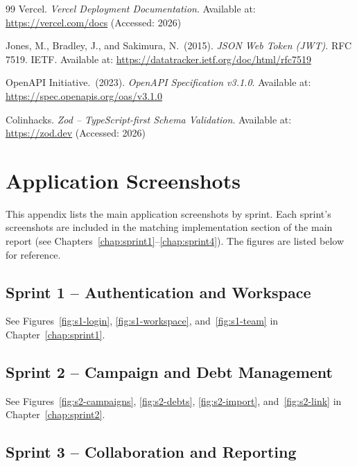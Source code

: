 \documentclass[12pt,a4paper]{report}
\begin{document}
\begin{thebibliography}{99}
    Vercel.
    \textit{Vercel Deployment Documentation}.
    Available at: \url{https://vercel.com/docs}
    (Accessed: 2026)

    Jones, M., Bradley, J., and Sakimura, N.\ (2015).
    \textit{JSON Web Token (JWT)}.
    RFC 7519. IETF.
    Available at: \url{https://datatracker.ietf.org/doc/html/rfc7519}

    OpenAPI Initiative.\ (2023).
    \textit{OpenAPI Specification v3.1.0}.
    Available at: \url{https://spec.openapis.org/oas/v3.1.0}

    Colinhacks.
    \textit{Zod -- TypeScript-first Schema Validation}.
    Available at: \url{https://zod.dev}
    (Accessed: 2026)

\end{thebibliography}

\appendix

\chapter{Application Screenshots}
\label{app:screenshots}

This appendix lists the main application screenshots by sprint.
Each sprint's screenshots are included in the matching implementation section of
the main report (see Chapters~\ref{chap:sprint1}--\ref{chap:sprint4}).
The figures are listed below for reference.

\section{Sprint 1 -- Authentication and Workspace}

See Figures~\ref{fig:s1-login}, \ref{fig:s1-workspace}, and~\ref{fig:s1-team}
in Chapter~\ref{chap:sprint1}.

\section{Sprint 2 -- Campaign and Debt Management}

See Figures~\ref{fig:s2-campaigns}, \ref{fig:s2-debts}, \ref{fig:s2-import},
and~\ref{fig:s2-link} in Chapter~\ref{chap:sprint2}.

\section{Sprint 3 -- Collaboration and Reporting}
\end{document}
